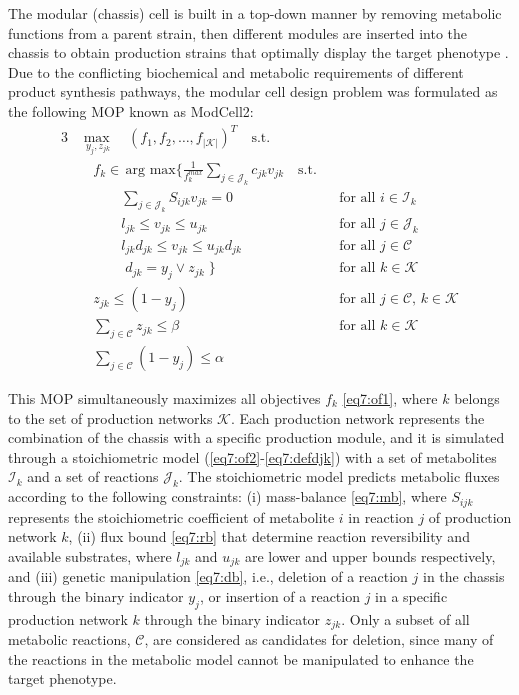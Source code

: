 The modular (chassis) cell is built in a top-down manner by removing metabolic functions from a parent strain, then different modules are inserted into the chassis to obtain production strains that optimally display the target phenotype .
Due to the conflicting biochemical and metabolic requirements of different product synthesis pathways, the modular cell design problem was formulated as the following MOP known as ModCell2:\citep{garcia2019}
\begingroup
\allowdisplaybreaks
\begin{alignat}{3}
    & \underset{ \; y_j, z_{jk}}{\max} \quad (f_1, f_2, \ldots, f_{|\mathcal{K}|})^T \quad \text{s.t.}  \label{eq7:of1} \\
    &  \quad f_k \in \, \text{arg }\underset{}{\text{max}} \Bigg\{ \frac{1}{f_k^{max}}\sum_{j \in \mathcal{J}_k} c_{jk}  v_{jk} \quad \text{s.t.} \label{eq7:of2}\\
    & \quad \qquad \sum_{j\in \mathcal{J}_k}S_{ijk}v_{jk} = 0 && \text{for all } i \in \mathcal{I}_k  \label{eq7:mb}\\
    & \quad \qquad  l_{jk} \le v_{jk} \le u_{jk}  && \text{for all } j \in \mathcal{J}_k \label{eq7:rb}\\
    & \quad \qquad  l_{jk} d_{jk} \le v_{jk} \le u_{jk} d_{jk} && \text{for all } j \in \mathcal{C} \label{eq7:db}\\
    & \quad \qquad \; d_{jk} = y_j \lor z_{jk} \; \Bigg\} && \text{for all } k \in \mathcal{K} \label{eq7:defdjk} \\
    & \quad z_{jk}\le (1-y_j) && \text{for all } j \in \mathcal{C}, \, k \in \mathcal{K} \label{eq7:mr1}\\
    & \quad \sum_{j \in \mathcal{C}}z_{jk} \le \beta && \text{for all } k \in \mathcal{K} \label{eq7:mr2} \\
    & \quad \sum_{j \in \mathcal{C}} (1-y_j) \le \alpha \label{eq7:a}
\end{alignat}
\endgroup

This MOP simultaneously maximizes all objectives $f_k$ \eqref{eq7:of1}, where $k$ belongs to the set of production networks $\mathcal{K}$.
Each production network represents the combination of the chassis with a specific production module, and it is simulated through a stoichiometric model\citep{palsson2015} (\ref{eq7:of2}-\ref{eq7:defdjk}) with a set of metabolites $\mathcal{I}_k$ and a set of reactions $\mathcal{J}_k$.
The stoichiometric model predicts metabolic fluxes according to the following constraints:
(i) mass-balance \eqref{eq7:mb}, where $S_{ijk}$ represents the stoichiometric coefficient of metabolite $i$ in reaction $j$ of production network $k$, (ii) flux bound \eqref{eq7:rb} that determine reaction reversibility and available substrates, where $l_{jk}$ and $u_{jk}$ are lower and upper bounds respectively, and (iii) genetic manipulation \eqref{eq7:db}, i.e., deletion of a reaction $j$ in the chassis through the binary indicator $y_{j}$, or insertion of a reaction $j$ in a specific production network $k$ through the binary indicator $z_{jk}$.
Only a subset of all metabolic reactions, $\mathcal{C}$, are considered as candidates for deletion, since many of the reactions in the metabolic model cannot be manipulated to enhance the target phenotype.

